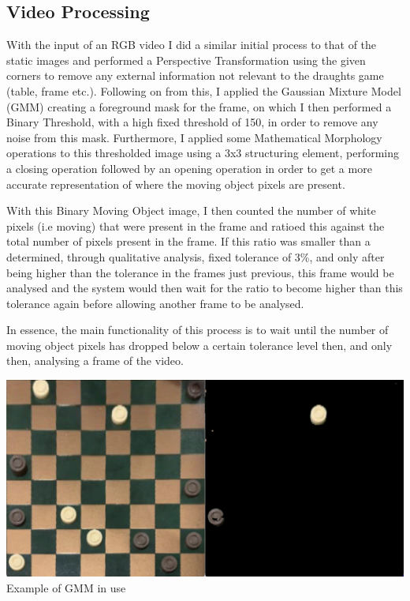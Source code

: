 \documentclass[11pt]{article}
\begin{document}
    \subsection{Video Processing}
    \par
    With the input of an RGB video I did a similar initial process to that of the static images and performed a Perspective Transformation using the given corners to remove any external information not relevant to the
    draughts game (table, frame etc.). Following on from this, I applied the Gaussian Mixture Model (GMM) creating a foreground mask for the frame, on which I then performed a Binary Threshold, with a high fixed threshold of 150, 
    in order to remove any noise from this mask. Furthermore, I applied some Mathematical Morphology operations to this thresholded image using a 3x3 structuring element, performing a closing operation followed by an opening
    operation in order to get a more accurate representation of where the moving object pixels are present.
    \par
    With this Binary Moving Object image, I then counted the number of white pixels (i.e moving) that were present in the frame and ratioed this against the total number of pixels present in the frame. If this ratio was smaller than
    a determined, through qualitative analysis, fixed tolerance of 3\%, and only after being higher than the tolerance in the frames just previous, this frame would be analysed and the system would then wait for the ratio to become higher than this tolerance again before allowing
    another frame to be analysed.
    \par
    In essence, the main functionality of this process is to wait until the number of moving object pixels has dropped below a certain tolerance level then, and only then, analysing a frame of the video.
    \begin{center}
        \includegraphics[scale=0.21]{GMMEg.png}
        \newline
        Example of GMM in use
    \end{center}
\end{document}
